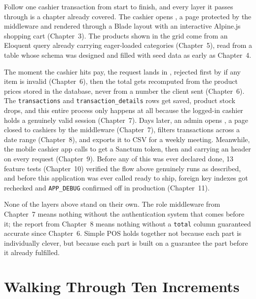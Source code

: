 Follow one cashier transaction from start to finish, and every layer it
passes through is a chapter already covered. The cashier opens
, a page protected by the  middleware and
rendered through a Blade layout with an interactive Alpine.js shopping
cart (Chapter~3). The products shown in the grid come from an Eloquent
query already carrying eager-loaded categories (Chapter~5), read from a
table whose schema was designed and filled with seed data as early as
Chapter~4.

The moment the cashier hits pay, the request lands in
, rejected first by
 if any item is invalid (Chapter~6),
then the total gets recomputed from the product prices stored in the
database, never from a number the client sent (Chapter~6). The
\texttt{transactions} and \texttt{transaction\_details} rows get saved,
product stock drops, and this entire process only happens at all
because the logged-in cashier holds a genuinely valid session
(Chapter~7). Days later, an admin opens , a page closed
to cashiers by the  middleware (Chapter~7),
filters transactions across a date range (Chapter~8), and exports it to
CSV for a weekly meeting. Meanwhile, the mobile cashier app calls
 to get a Sanctum token, then  and  carrying an
 header on every request (Chapter~9).
Before any of this was ever declared done, 13 feature tests
(Chapter~10) verified the flow above genuinely runs as described, and
before this application was ever called ready to ship, foreign key
indexes got rechecked and \texttt{APP\_DEBUG} confirmed off in
production (Chapter~11).

\begin{notebox}
None of the layers above stand on their own. The role middleware from
Chapter~7 means nothing without the authentication system that comes
before it; the report from Chapter~8 means nothing without a
\texttt{total} column guaranteed accurate since Chapter~6. Simple POS
holds together not because each part is individually clever, but
because each part is built on a guarantee the part before it already
fulfilled.
\end{notebox}

\section{Walking Through Ten Increments}
\label{sec:studi-kasus-menyeluruh-2}

